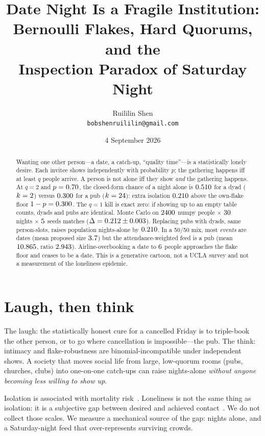 \documentclass[10pt,twocolumn]{article}
\title{Date Night Is a Fragile Institution:\\
Bernoulli Flakes, Hard Quorums, and the\\
Inspection Paradox of Saturday Night}
\author{Ruililin Shen\\
\texttt{bobshenruililin@gmail.com}}
\date{4 September 2026}
\begin{document}
\maketitle
\begin{abstract}
Wanting one other person---a date, a catch-up, ``quality time''---is a
statistically lonely desire. Each invitee shows independently with
probability $p$; the gathering happens iff at least $q$ people arrive.
A person is not alone iff they show \emph{and} the gathering happens.
At $q=2$ and $p=0.70$, the closed-form chance of a night alone is
$0.510$ for a dyad ($k=2$) versus
$0.300$ for a pub ($k=24$): extra isolation
$0.210$ above the own-flake floor $1-p=0.300$.
The $q=1$ kill is exact zero: if showing up to an empty table counts,
dyads and pubs are identical. Monte Carlo on
$2400$ numpy people $\times$ $30$ nights
$\times$ $5$ seeds matches
($\Delta=0.212\pm0.003$).
Replacing pubs with dyads, same person-slots, raises population nights-alone
by $0.210$. In a 50/50 mix, most \emph{events} are dates
(mean proposed size $3.7$) but the attendance-weighted feed
is a pub (mean $10.865$, ratio $2.943$).
Airline-overbooking a date to $6$ people approaches the
flake floor and ceases to be a date. This is a generative cartoon, not a
UCLA survey and not a measurement of the loneliness epidemic.
\end{abstract}

\section{Laugh, then think}

The laugh: the statistically honest cure for a cancelled Friday is to
triple-book the other person, or to go where cancellation is impossible---the
pub. The think: intimacy and flake-robustness are binomial-incompatible
under independent shows. A society that moves social life from large,
low-quorum rooms (pubs, churches, clubs) into one-on-one catch-ups can
raise nights-alone \emph{without anyone becoming less willing to show up}.

Isolation is associated with mortality risk~\cite{holtlunstad2015mortality}.
Loneliness is not the same thing as isolation: it is a subjective gap
between desired and achieved contact~\cite{cacioppo2010loneliness,hughes2004short,russell1980ucla}.
We do not collect those scales. We measure a mechanical source of the
gap: nights alone, and a Saturday-night feed that over-represents surviving
crowds.
\end{document}

